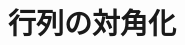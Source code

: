 \documentclass[../../topic_linear-algebra]{subfiles}
\begin{document}
\chapter{行列の対角化}


\end{document}
